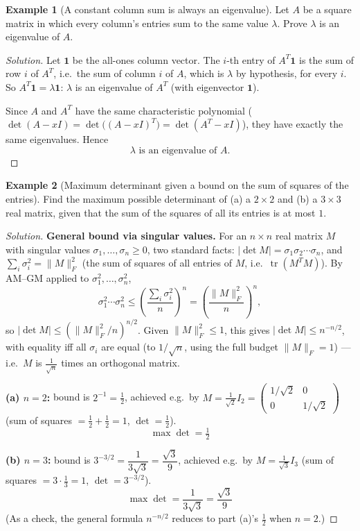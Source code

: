 \documentclass[11pt]{article}
\theoremstyle{definition}
\newtheorem{example}{Example}[section]
\newcommand{\trace}{\operatorname{tr}}
\begin{document}
\begin{example}[A constant column sum is always an eigenvalue]
Let $A$ be a square matrix in which every column's entries sum to the same value $\lambda$. Prove $\lambda$ is an eigenvalue of $A$.
\end{example}
\begin{proof}[Solution]
Let $\mathbf 1$ be the all-ones column vector. The $i$-th entry of $A^T\mathbf1$ is the sum of row $i$ of $A^T$, i.e.\ the sum of column $i$ of $A$, which is $\lambda$ by hypothesis, for every $i$. So $A^T\mathbf1=\lambda\mathbf1$: $\lambda$ is an eigenvalue of $A^T$ (with eigenvector $\mathbf1$).

Since $A$ and $A^T$ have the same characteristic polynomial ($\det(A-xI)=\det\bigl((A-xI)^T\bigr)=\det(A^T-xI)$), they have exactly the same eigenvalues. Hence
\[
\boxed{\lambda\text{ is an eigenvalue of }A}.
\]
\end{proof}

\begin{example}[Maximum determinant given a bound on the sum of squares of the entries]
Find the maximum possible determinant of (a) a $2\times2$ and (b) a $3\times3$ real matrix, given that the sum of the squares of all its entries is at most $1$.
\end{example}
\begin{proof}[Solution]
\textbf{General bound via singular values.} For an $n\times n$ real matrix $M$ with singular values $\sigma_1,\dots,\sigma_n\ge0$, two standard facts: $|\det M|=\sigma_1\sigma_2\cdots\sigma_n$, and $\sum_i\sigma_i^2=\|M\|_F^2$ (the sum of squares of all entries of $M$, i.e.\ $\trace(M^TM)$). By AM–GM applied to $\sigma_1^2,\dots,\sigma_n^2$,
\[
\sigma_1^2\cdots\sigma_n^2\le\left(\frac{\sum_i\sigma_i^2}{n}\right)^n=\left(\frac{\|M\|_F^2}{n}\right)^n,
\]
so $|\det M|\le\left(\|M\|_F^2/n\right)^{n/2}$. Given $\|M\|_F^2\le1$, this gives $|\det M|\le n^{-n/2}$, with equality iff all $\sigma_i$ are equal (to $1/\sqrt n$, using the full budget $\|M\|_F=1$) — i.e.\ $M$ is $\tfrac1{\sqrt n}$ times an orthogonal matrix.

\textbf{(a) $n=2$:} bound is $2^{-1}=\tfrac12$, achieved e.g.\ by $M=\tfrac1{\sqrt2}I_2=\begin{pmatrix}1/\sqrt2&0\\0&1/\sqrt2\end{pmatrix}$ (sum of squares $=\tfrac12+\tfrac12=1$, $\det=\tfrac12$).
\[
\boxed{\max\det=\tfrac12}
\]

\textbf{(b) $n=3$:} bound is $3^{-3/2}=\dfrac{1}{3\sqrt3}=\dfrac{\sqrt3}{9}$, achieved e.g.\ by $M=\tfrac1{\sqrt3}I_3$ (sum of squares $=3\cdot\tfrac13=1$, $\det=3^{-3/2}$).
\[
\boxed{\max\det=\dfrac{1}{3\sqrt3}=\dfrac{\sqrt3}{9}}
\]
(As a check, the general formula $n^{-n/2}$ reduces to part (a)'s $\tfrac12$ when $n=2$.)
\end{proof}
\end{document}
